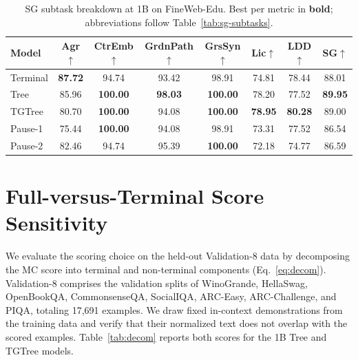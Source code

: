 \documentclass[11pt]{article}
\begin{document}
\begin{table}[t]
  \centering
  \fontsize{8pt}{10pt}\selectfont
  \setlength{\tabcolsep}{4pt}
  \begin{tabular}{lccccccc}
    \toprule
    Model & Agr$\uparrow$ & CtrEmb$\uparrow$ & GrdnPath$\uparrow$ & GrsSyn$\uparrow$ & Lic$\uparrow$ & LDD$\uparrow$ & SG$\uparrow$ \\
    \midrule
    Terminal & \textbf{87.72} & 94.74 & 93.42 & 98.91 & 74.81 & 78.44 & 88.01 \\
    Tree & 85.96 & \textbf{100.00} & \textbf{98.03} & \textbf{100.00} & 78.20 & 77.52 & \textbf{89.95} \\
    TGTree & 80.70 & \textbf{100.00} & 94.08 & \textbf{100.00} & \textbf{78.95} & \textbf{80.28} & 89.00 \\
    Pause-1 & 75.44 & \textbf{100.00} & 94.08 & 98.91 & 73.31 & 77.52 & 86.54 \\
    Pause-2 & 82.46 & 94.74 & 95.39 & \textbf{100.00} & 72.18 & 74.77 & 86.59 \\
    \bottomrule
  \end{tabular}
  \caption{SG subtask breakdown at 1B on FineWeb-Edu. Best per metric in \textbf{bold}; abbreviations follow Table~\ref{tab:sg-subtasks}.}
  \label{tab:sg-subtasks-1b}
\end{table}


\section{Full-versus-Terminal Score Sensitivity}
\label{sec:decom}

We evaluate the scoring choice on the held-out Validation-8 data by decomposing the MC score into terminal and non-terminal components (Eq.~\ref{eq:decom}). Validation-8 comprises the validation splits of WinoGrande, HellaSwag, OpenBookQA, CommonsenseQA, SocialIQA, ARC-Easy, ARC-Challenge, and PIQA, totaling 17,691 examples. We draw fixed in-context demonstrations from the training data and verify that their normalized text does not overlap with the scored examples. Table~\ref{tab:decom} reports both scores for the 1B Tree and TGTree models.
\end{document}
